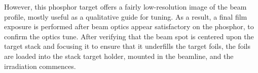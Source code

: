 However, this phosphor target offers a fairly low-resolution image of the beam profile, mostly useful as a qualitative guide for tuning.
As a result, a final film exposure is performed after beam optics appear satisfactory on the phosphor, to confirm the optics tune.
After verifying that 
the beam spot is centered upon the target stack and focusing it to ensure that it underfills the target foils, the foils are loaded into the stack target holder, mounted in the beamline, and the irradiation commences.
 









